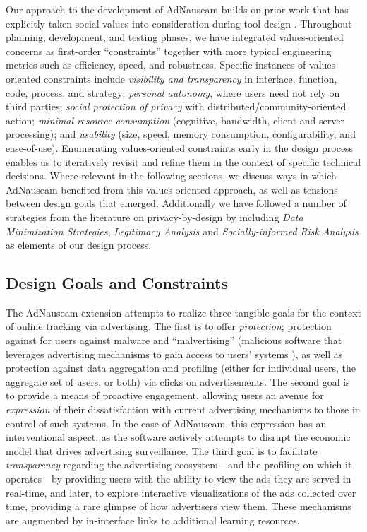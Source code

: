 \documentclass[conference]{IEEEtran}
\begin{document}
Our approach to the development of AdNauseam builds on prior work that has explicitly taken social values into consideration during tool design \cite{Friedman,Flanagan,Howe-1}. Throughout planning, development, and testing phases, we have integrated values-oriented concerns as first-order “constraints” together with more typical engineering metrics such as efficiency, speed, and robustness. Specific instances of values-oriented constraints include \emph{visibility and transparency} in interface, function, code, process, and strategy; \emph{personal autonomy}, where users need not rely on third parties; \emph{social protection of privacy} with distributed/community-oriented action; \emph{minimal resource consumption} (cognitive, bandwidth, client and server processing); and \emph{usability} (size, speed, memory consumption, configurability, and ease-of-use). Enumerating values-oriented constraints early in the design process enables us to iteratively revisit and refine them in the context of specific technical decisions. Where relevant in the following sections, we discuss ways in which AdNauseam benefited from this values-oriented approach, as well as tensions between design goals that emerged. Additionally we have followed a number of strategies from the literature on privacy-by-design \cite{Gurses-0, Hoepman, Gurses-1, Hansen, Cavoukian} by including \emph{Data Minimization Strategies}, \emph{Legitimacy Analysis} and \emph{Socially-informed Risk Analysis} as elements of our design process.

\subsection{Design Goals and Constraints}

The AdNauseam extension attempts to realize three tangible goals for the context of online tracking via advertising. The first is to offer \emph{protection}; protection against for users against malware and “malvertising” (malicious software that leverages advertising mechanisms to gain access to users' systems \cite{Mansfield}), as well as protection against data aggregation and profiling (either for individual users, the aggregate set of users, or both)  via clicks on advertisements. The second goal is to provide a means of proactive engagement, allowing users an avenue for \emph{expression} of their dissatisfaction with current advertising mechanisms to those in control of such systems. In the case of AdNauseam, this expression has an interventional aspect, as the software actively attempts to disrupt the economic model that drives advertising surveillance. The third goal is to facilitate \emph{transparency} regarding the advertising ecosystem---and the profiling on which it operates---by providing users with the ability to view the ads they are served in real-time, and later, to explore interactive visualizations of the ads collected over time, providing a rare glimpse of how advertisers view them. These mechanisms are augmented by in-interface links to additional learning resources.
\end{document}
